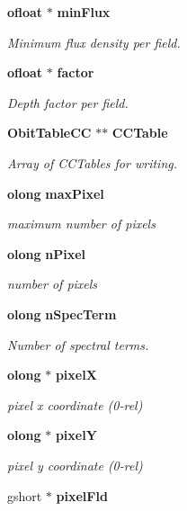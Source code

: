 \begin{CompactItemize}
{\bf ofloat} $\ast$ {\bf min\-Flux}
\begin{CompactList}\small\item\em Minimum flux density per field. \item\end{CompactList}\item 
{\bf ofloat} $\ast$ {\bf factor}
\begin{CompactList}\small\item\em Depth factor per field. \item\end{CompactList}\item 
{\bf Obit\-Table\-CC} $\ast$$\ast$ {\bf CCTable}
\begin{CompactList}\small\item\em Array of CCTables for writing. \item\end{CompactList}\item 
{\bf olong} {\bf max\-Pixel}
\begin{CompactList}\small\item\em maximum number of pixels \item\end{CompactList}\item 
{\bf olong} {\bf n\-Pixel}
\begin{CompactList}\small\item\em number of pixels \item\end{CompactList}\item 
{\bf olong} {\bf n\-Spec\-Term}
\begin{CompactList}\small\item\em Number of spectral terms. \item\end{CompactList}\item 
{\bf olong} $\ast$ {\bf pixel\-X}
\begin{CompactList}\small\item\em pixel x coordinate (0-rel) \item\end{CompactList}\item 
{\bf olong} $\ast$ {\bf pixel\-Y}
\begin{CompactList}\small\item\em pixel y coordinate (0-rel) \item\end{CompactList}\item 
gshort $\ast$ {\bf pixel\-Fld}
$$
\end{CompactItemize}
